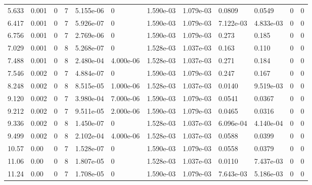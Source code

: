 \documentclass[preview]{standalone}
\begin{document}
{{\begin{tabular}{L{1.2cm}C{1.2cm} C{0.3cm}C{0.5cm} C{1.4cm}C{1.4cm} C{1.4cm}C{1.4cm} C{1.6cm}C{1.6cm} C{1.6cm}C{1.6cm}}
  5.633  &  0.001  & 0     &  7 &  5.155e-06  & 0  &  1.590e-03&   1.079e-03& 0.0809 & 0.0549   &  0 & 0  \\ 
  6.417  &  0.001  & 0     &  7 &  5.926e-07  & 0  &  1.590e-03&   1.079e-03& 7.122e-03 & 4.833e-03   &  0 & 0  \\ 
  6.756  &  0.001  & 0     &  7 &  2.769e-06  & 0  &  1.590e-03&   1.079e-03& 0.273 & 0.185   &  0 & 0  \\ 
  7.029  &  0.001  & 0     &  8 &  5.268e-07  & 0  &  1.528e-03&   1.037e-03& 0.163 & 0.110   &  0 & 0  \\ 
  7.488  &  0.001  & 0     &  8 &  2.480e-04  & 4.000e-06  &  1.528e-03&   1.037e-03& 0.271 & 0.184   &  0 & 0  \\ 
  7.546  &  0.002  & 0     &  7 &  4.884e-07  & 0  &  1.590e-03&   1.079e-03& 0.247 & 0.167   &  0 & 0  \\ 
  8.248  &  0.002  & 0     &  8 &  8.515e-05  & 1.000e-06  &  1.528e-03&   1.037e-03& 0.0140 & 9.519e-03   &  0 & 0  \\ 
  9.120  &  0.002  & 0     &  7 &  3.980e-04  & 7.000e-06  &  1.590e-03&   1.079e-03& 0.0541 & 0.0367   &  0 & 0  \\ 
  9.212  &  0.002  & 0     &  7 &  9.511e-05  & 2.000e-06  &  1.590e-03&   1.079e-03& 0.0465 & 0.0316   &  0 & 0  \\ 
  9.336  &  0.002  & 0     &  8 &  1.450e-07  & 0  &  1.528e-03&   1.037e-03& 6.096e-04 & 4.140e-04   &  0 & 0  \\ 
  9.499  &  0.002  & 0     &  8 &  2.102e-04  & 4.000e-06  &  1.528e-03&   1.037e-03& 0.0588 & 0.0399   &  0 & 0  \\ 
  10.57  &  0.00  & 0     &  7 &  1.528e-07  & 0  &  1.590e-03&   1.079e-03& 0.0558 & 0.0379   &  0 & 0  \\ 
  11.06  &  0.00  & 0     &  8 &  1.807e-05  & 0  &  1.528e-03&   1.037e-03& 0.0110 & 7.437e-03   &  0 & 0  \\ 
  11.24  &  0.00  & 0     &  7 &  1.708e-05  & 0  &  1.590e-03&   1.079e-03& 7.643e-03 & 5.186e-03   &  0 & 0  \\ 
\hline 
\end{tabular} 

}}
\end{document}
